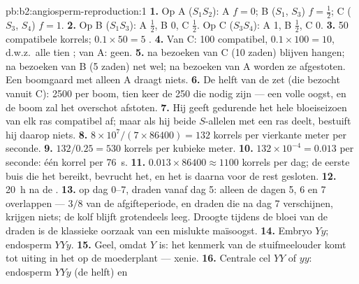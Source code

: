 \begin{solution}{pb:b2:angiosperm-reproduction:1}
\textbf{1.} Op A ($S_1S_2$):  A $f = 0$; B ($S_1$, $S_3$) $f =
\tfrac12$; C ($S_3$, $S_4$) $f = 1$.
\textbf{2.} Op B ($S_1S_3$): A $\tfrac12$, B 0, C $\tfrac12$. Op C
($S_3S_4$): A 1, B $\tfrac12$, C 0.
\textbf{3.} 50 compatibele korrels; $0.1\times 50 = 5$ .
\textbf{4.} Van C: 100 compatibel, $0.1\times 100 = 10$, d.w.z.\ alle
tien ; van A: geen.
\textbf{5.}  na bezoeken van C (10 zaden) blijven hangen; na
bezoeken van B (5 zaden) net wel; na bezoeken van A worden ze afgestoten.
Een boomgaard met alleen A draagt niets.
\textbf{6.} De helft van de  zet  (die bezocht vanuit C): 2500
 per boom, tien keer de 250 die nodig zijn --- een volle oogst, en
de boom zal het overschot afstoten.
\textbf{7.} Hij geeft gedurende het hele bloeiseizoen van elk ras
compatibel  af; maar als hij beide $S$-allelen met een ras
deelt, bestuift hij daarop niets.
\textbf{8.} $8\times 10^{7}/(7\times 86400) = 132$ korrels per vierkante
meter per seconde.
\textbf{9.} $132/0.25 = 530$ korrels per kubieke meter.
\textbf{10.} $132\times 10^{-4} = 0.013$ per seconde: één korrel per
\qty{76}{s}.
\textbf{11.} $0.013\times 86400 \approx 1100$ korrels per dag; de eerste
buis die het  bereikt, bevrucht het, en het  is
daarna voor de rest gesloten.
\textbf{12.} \qty{20}{h} na de .
\textbf{13.}  op dag 0--7, draden vanaf dag 5: alleen de dagen 5,
6 en 7 overlappen --- $3/8$ van de afgifteperiode, en draden die na dag 7
verschijnen, krijgen niets; de kolf blijft grotendeels leeg. Droogte tijdens
de bloei van de draden is de klassieke oorzaak van een mislukte maïsoogst.
\textbf{14.} Embryo $Yy$; endosperm $YYy$.
\textbf{15.} Geel, omdat $Y$  is: het kenmerk van de stuifmeelouder
komt tot uiting in het  op de moederplant --- xenie.
\textbf{16.} Centrale cel $YY$ of $yy$: endosperm $YYy$ (de helft) en

\end{solution}
